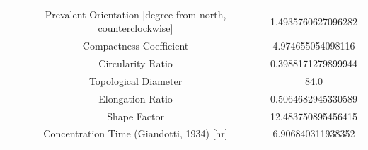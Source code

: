 \documentclass[11pt,]{article}
\begin{document}
\begin{longtable}[]{@{}cc@{}}
\begin{minipage}[t]{0.65\columnwidth}\centering\strut
Prevalent Orientation {[}degree from north, counterclockwise{]}\strut
\end{minipage} & \begin{minipage}[t]{0.29\columnwidth}\centering\strut
1.4935760627096282\strut
\end{minipage}\tabularnewline
\begin{minipage}[t]{0.65\columnwidth}\centering\strut
Compactness Coefficient\strut
\end{minipage} & \begin{minipage}[t]{0.29\columnwidth}\centering\strut
4.974655054098116\strut
\end{minipage}\tabularnewline
\begin{minipage}[t]{0.65\columnwidth}\centering\strut
Circularity Ratio\strut
\end{minipage} & \begin{minipage}[t]{0.29\columnwidth}\centering\strut
0.3988171279899944\strut
\end{minipage}\tabularnewline
\begin{minipage}[t]{0.65\columnwidth}\centering\strut
Topological Diameter\strut
\end{minipage} & \begin{minipage}[t]{0.29\columnwidth}\centering\strut
84.0\strut
\end{minipage}\tabularnewline
\begin{minipage}[t]{0.65\columnwidth}\centering\strut
Elongation Ratio\strut
\end{minipage} & \begin{minipage}[t]{0.29\columnwidth}\centering\strut
0.5064682945330589\strut
\end{minipage}\tabularnewline
\begin{minipage}[t]{0.65\columnwidth}\centering\strut
Shape Factor\strut
\end{minipage} & \begin{minipage}[t]{0.29\columnwidth}\centering\strut
12.483750895456415\strut
\end{minipage}\tabularnewline
\begin{minipage}[t]{0.65\columnwidth}\centering\strut
Concentration Time (Giandotti, 1934) {[}hr{]}\strut
\end{minipage} & \begin{minipage}[t]{0.29\columnwidth}\centering\strut
6.906840311938352\strut
\end{minipage}\tabularnewline

\end{longtable}
\end{document}
